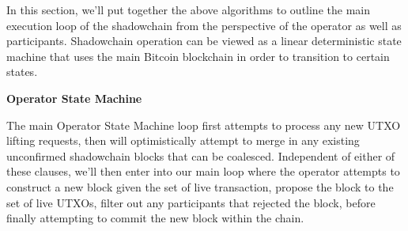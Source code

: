 \documentclass[10pt,a4paper]{article}
\theoremstyle{definition}
\begin{document}
In this section, we'll put together the above algorithms to outline the main
execution loop of the shadowchain from the perspective of the operator as well
as participants. Shadowchain operation can be viewed as a linear deterministic
state machine that uses the main Bitcoin blockchain in order to transition to
certain states.


\begin{center}
    \textbf{Operator State Machine}
\end{center}

The main Operator State Machine loop first attempts to process any new UTXO
lifting requests, then will optimistically attempt to merge in any existing
unconfirmed shadowchain blocks that can be coalesced. Independent of either of
these clauses, we'll then enter into our main loop where the operator attempts
to construct a new block given the set of live transaction, propose the block
to the set of live UTXOs, filter out any participants that rejected the block,
before finally attempting to commit the new block within the chain.

\end{document}
